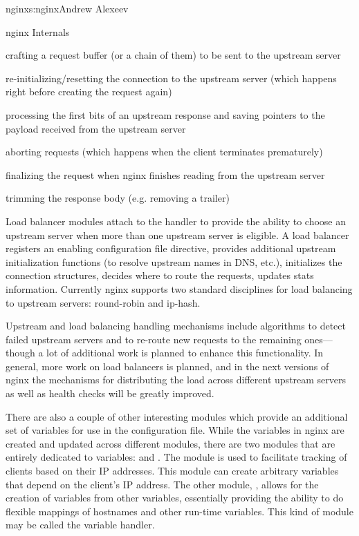\begin{aosachapter}{nginx}{s:nginx}{Andrew Alexeev}
\begin{aosasect1}{nginx Internals}
\begin{aosaitemize}

\item crafting a request buffer (or a chain of them) to be sent to the
  upstream server

\item re-initializing/resetting the connection to the upstream server
  (which happens right before creating the request again)

\item processing the first bits of an upstream response and saving
  pointers to the payload received from the upstream server

\item aborting requests (which happens when the client terminates
  prematurely)

\item finalizing the request when nginx finishes reading from the
  upstream server

\item trimming the response body (e.g. removing a trailer)

\end{aosaitemize}

Load balancer modules attach to the  handler to
provide the ability to choose an upstream server when more than one
upstream server is eligible. A load balancer registers an enabling
configuration file directive, provides additional upstream
initialization functions (to resolve upstream names in DNS, etc.),
initializes the connection structures, decides where to route the
requests, updates stats %
information. Currently nginx supports two standard disciplines for
load balancing to upstream servers: round-robin and ip-hash.

Upstream and load balancing handling mechanisms include algorithms to
detect failed upstream servers and to re-route new requests to the
remaining ones---though a lot of additional work is planned to enhance
this functionality. In general, more work on load balancers is
planned, and in the next versions of nginx the mechanisms for
distributing the load across different upstream servers as well as
health checks will be greatly improved.

There are also a couple of other interesting modules which provide an
additional set of variables for use in the configuration file. While
the variables in nginx are created and updated across different
modules, there are two modules that are entirely dedicated to
variables:  and . The  module is used to
facilitate tracking of clients based on their IP addresses. This
module can create arbitrary variables that depend on the client's IP
address. The other module, , allows for the creation of
variables from other variables, essentially providing the ability to
do flexible mappings of hostnames and other run-time variables. This
kind of module may be called the variable handler.


\end{aosasect1}
\end{aosachapter}
